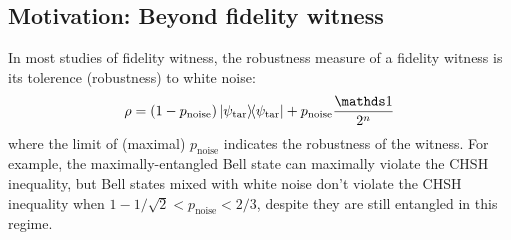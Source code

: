 \documentclass[
aps,
pra,
twocolumn,
floatfix,
]{revtex4-2}
\theoremstyle{plain}
\newtheorem{theorem}{Theorem}
\theoremstyle{definition}
\newcommand{\dm}{\rho}
\newcommand{\ghz}{\text{GHZ}}
\newcommand{\target}{\textup{tar}}
\newcommand{\noise}{\text{noise}}
\newcommand{\D}{\mathcal{D}}
\begin{document}
\subsection{Motivation: Beyond fidelity witness}
In most studies of fidelity witness, the robustness measure of a fidelity witness is its tolerence (robustness) to white noise:
\begin{equation}\label{eq:white_noise}
	\dm
	= (1-p_{\noise}) \op{\psi_{\target}} + p_{\noise} \frac{\identity}{2^{n}}
\end{equation}
where the limit of (maximal) $p_{\noise}$ indicates the robustness of the witness.
For example, the maximally-entangled Bell state can maximally violate the CHSH inequality, 
but Bell states mixed with white noise don't violate the CHSH inequality when $ 1- 1/ \sqrt{2} < p_{\noise}<2/3 $, despite they are still entangled in this regime.
\end{document}
